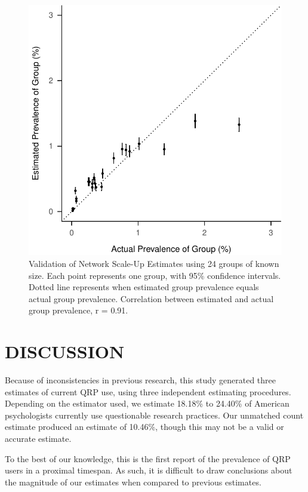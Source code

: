 \documentclass[jou]{apa6}
\theoremstyle{definition}
\theoremstyle{definition}
\theoremstyle{definition}
\theoremstyle{remark}
\begin{document}
\begin{figure}
\centering
\includegraphics{How_Many_QRP_Users_preprint_files/figure-latex/unnamed-chunk-14-1.pdf}
\caption{\label{fig:unnamed-chunk-14}\label{fig:validity}Validation of
Network Scale-Up Estimates using 24 groups of known size. Each point
represents one group, with 95\% confidence intervals. Dotted line
represents when estimated group prevalence equals actual group
prevalence. Correlation between estimated and actual group prevalence, r
= 0.91.}
\end{figure}

\section{DISCUSSION}\label{discussion}

Because of inconsistencies in previous research, this study generated
three estimates of current QRP use, using three independent estimating
procedures. Depending on the estimator used, we estimate 18.18\% to
24.40\% of American psychologists currently use questionable research
practices. Our unmatched count estimate produced an estimate of 10.46\%,
though this may not be a valid or accurate estimate.

To the best of our knowledge, this is the first report of the prevalence
of QRP users in a proximal timespan. As such, it is difficult to draw
conclusions about the magnitude of our estimates when compared to
previous estimates.
\end{document}
